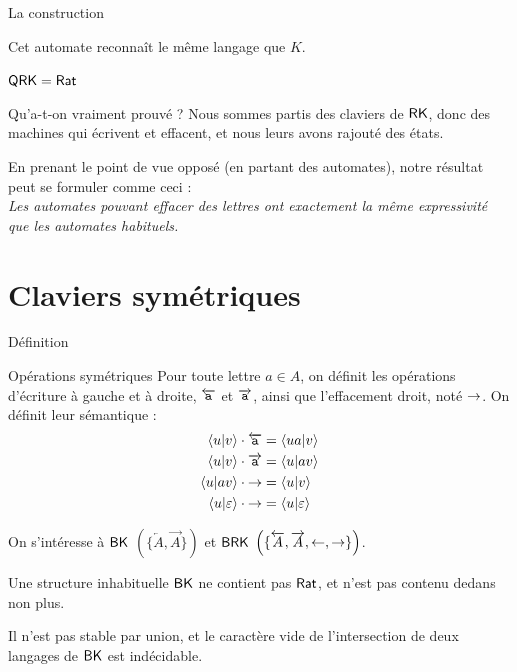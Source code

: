 \documentclass[11pt,french,professionalfonts]{beamer}
\begin{document}
\begin{frame}{La construction}
\begin{center}
		Cet automate reconnaît le même langage que $K$.
	\end{center}
\end{frame}
\begin{frame}[standout]
	$\mathsf{QRK} = \mathsf{Rat}$
\end{frame}

\begin{frame}{Qu'a-t-on vraiment prouvé ?}
	Nous sommes partis des claviers de $\mathsf{RK}$, donc des machines qui écrivent et effacent, et nous leurs avons rajouté des états.
	\pause

    En prenant le point de vue opposé (en partant des automates), notre résultat peut se formuler comme ceci : \\
    \emph{Les automates pouvant effacer des lettres ont exactement la même expressivité que les automates habituels.}
\end{frame}

\section{Claviers symétriques}
\begin{frame}{Définition}
	\begin{block}{Opérations symétriques}
		Pour toute lettre $a \in A$, on définit les opérations d'écriture à gauche et à droite, $\overleftarrow{\mathtt{a}}$ et $\overrightarrow{\mathtt{a}}$, ainsi que l'effacement droit, noté $\mathord{\rightarrow}$.
        On définit leur sémantique :
        \begin{align*}
            \left\langle u \middle| v \right\rangle \cdot \overleftarrow{\mathtt{a}} &= \left\langle ua \middle| v \right\rangle   \\
            \left\langle u \middle| v \right\rangle \cdot \overrightarrow{\mathtt{a}} &= \left\langle u \middle| av \right\rangle   \\
            \left\langle u \middle| av \right\rangle \cdot \mathord{\rightarrow} &= \left\langle u \middle| v \right\rangle        \\
            \left\langle u \middle| \varepsilon \right\rangle \cdot \mathord{\rightarrow} &= \left\langle u \middle| \varepsilon \right\rangle
        \end{align*}
	\end{block} \pause
	On s'intéresse à $\mathsf{BK}$ $\left(\{\overleftarrow{A},\overrightarrow{A}\}\right)$ et $\mathsf{BRK}$ $\left(\{\overleftarrow{A},\overrightarrow{A},\mathord{\leftarrow},\mathord{\rightarrow}\}\right)$.

\end{frame}

\begin{frame}{Une structure inhabituelle}
	$\mathsf{BK}$ ne contient pas $\mathsf{Rat}$, et n'est pas contenu dedans non plus. 
	\pause

	Il n'est pas stable par union, et le caractère vide de l'intersection de deux langages de $\mathsf{BK}$ est indécidable.
	
\end{frame}
\end{document}
